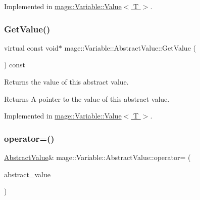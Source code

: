 Implemented in \hyperlink{structmage_1_1_variable_1_1_value_a4d59fec74fc5d25ecca86054ecc8d15d}{mage\+::\+Variable\+::\+Value$<$ T $>$}.

\hypertarget{structmage_1_1_variable_1_1_abstract_value_aede2a77b571b80794a4254e34144f4c1}{}\label{structmage_1_1_variable_1_1_abstract_value_aede2a77b571b80794a4254e34144f4c1} 
\subsubsection{\texorpdfstring{Get\+Value()}{GetValue()}}
{\footnotesize\ttfamily virtual const void$\ast$ mage\+::\+Variable\+::\+Abstract\+Value\+::\+Get\+Value (\begin{DoxyParamCaption}{ }\end{DoxyParamCaption}) const\hspace{0.3cm}{\ttfamily [pure virtual]}}

Returns the value of this abstract value.

\begin{DoxyReturn}{Returns}
A pointer to the value of this abstract value. 
\end{DoxyReturn}


Implemented in \hyperlink{structmage_1_1_variable_1_1_value_a04d70496ebb7ad71dafa3df877daeb26}{mage\+::\+Variable\+::\+Value$<$ T $>$}.

\hypertarget{structmage_1_1_variable_1_1_abstract_value_a77f7107e78716a0ea76cfaedd0a50a4b}{}\label{structmage_1_1_variable_1_1_abstract_value_a77f7107e78716a0ea76cfaedd0a50a4b} 
\subsubsection{\texorpdfstring{operator=()}{operator=()}\hspace{0.1cm}{\footnotesize\ttfamily [1/2]}}
{\footnotesize\ttfamily \hyperlink{structmage_1_1_variable_1_1_abstract_value}{Abstract\+Value}\& mage\+::\+Variable\+::\+Abstract\+Value\+::operator= (\begin{DoxyParamCaption}\item[{const \hyperlink{structmage_1_1_variable_1_1_abstract_value}{Abstract\+Value} \&}]{abstract\+\_\+value }\end{DoxyParamCaption})\hspace{0.3cm}{\ttfamily [delete]}}

